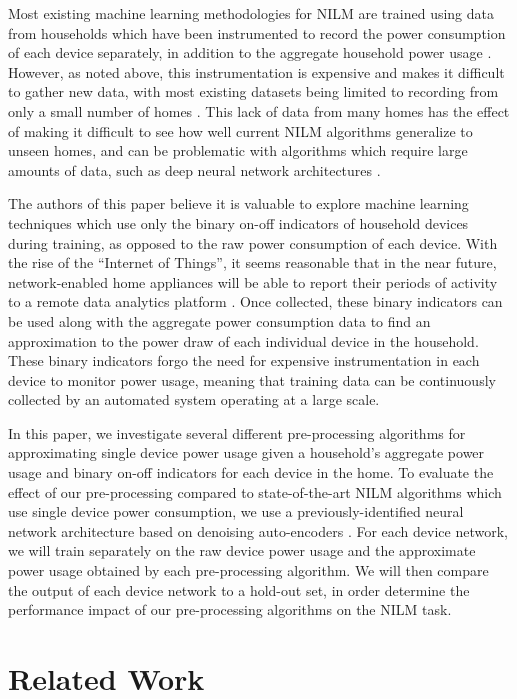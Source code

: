 \documentclass{article}
\begin{document}
Most existing machine learning methodologies for NILM are trained using data from households which have been instrumented to record the power consumption of each device separately, in addition to the aggregate household power usage \cite{Kelly}\cite{Cicchetti}.
However, as noted above, this instrumentation is expensive and makes it difficult to gather new data, with most existing datasets being limited to recording from only a small number of homes \cite{Redd}\cite{Kelly2}.
This lack of data from many homes has the effect of making it difficult to see how well current NILM algorithms generalize to unseen homes, and can be problematic with algorithms which require large amounts of data, such as deep neural network architectures \cite{Kelly}.

The authors of this paper believe it is valuable to explore machine learning techniques which use only the binary on-off indicators of household devices during training, as opposed to the raw power consumption of each device.
With the rise of the ``Internet of Things'', it seems reasonable that in the near future, network-enabled home appliances will be able to report their periods of activity to a remote data analytics platform \cite{Gubbi}.
Once collected, these binary indicators can be used along with the aggregate power consumption data to find an approximation to the power draw of each individual device in the household.
These binary indicators forgo the need for expensive instrumentation in each device to monitor power usage, meaning that training data can be continuously collected by an automated system operating at a large scale.

In this paper, we investigate several different pre-processing algorithms for approximating single device power usage given a household's aggregate power usage and binary on-off indicators for each device in the home.
To evaluate the effect of our pre-processing compared to state-of-the-art NILM algorithms which use single device power consumption, we use a previously-identified neural network architecture based on denoising auto-encoders \cite{Kelly}.
For each device network, we will train separately on the raw device power usage and the approximate power usage obtained by each pre-processing algorithm.
We will then compare the output of each device network to a hold-out set, in order determine the performance impact of our pre-processing algorithms on the NILM task.

\section{Related Work}
\end{document}
